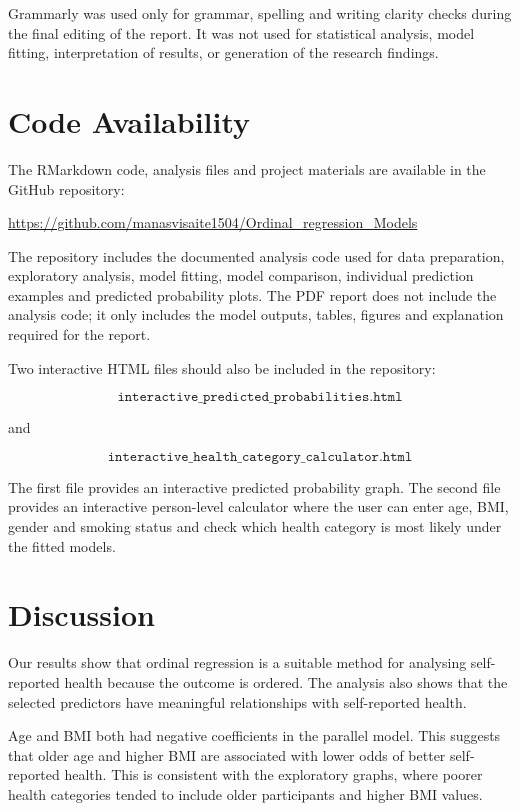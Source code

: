 \documentclass{article}
\begin{document}
Grammarly was used only for grammar, spelling and writing clarity checks
during the final editing of the report. It was not used for statistical
analysis, model fitting, interpretation of results, or generation of the
research findings.

\section{Code Availability}\label{code-availability}

The RMarkdown code, analysis files and project materials are available
in the GitHub repository:

\url{https://github.com/manasvisaite1504/Ordinal_regression_Models}

The repository includes the documented analysis code used for data
preparation, exploratory analysis, model fitting, model comparison,
individual prediction examples and predicted probability plots. The PDF
report does not include the analysis code; it only includes the model
outputs, tables, figures and explanation required for the report.

Two interactive HTML files should also be included in the repository:

\[
\texttt{interactive\_predicted\_probabilities.html}
\]

and

\[
\texttt{interactive\_health\_category\_calculator.html}
\]

The first file provides an interactive predicted probability graph. The
second file provides an interactive person-level calculator where the
user can enter age, BMI, gender and smoking status and check which
health category is most likely under the fitted models.

\section{Discussion}\label{discussion}

Our results show that ordinal regression is a suitable method for
analysing self-reported health because the outcome is ordered. The
analysis also shows that the selected predictors have meaningful
relationships with self-reported health.

Age and BMI both had negative coefficients in the parallel model. This
suggests that older age and higher BMI are associated with lower odds of
better self-reported health. This is consistent with the exploratory
graphs, where poorer health categories tended to include older
participants and higher BMI values.
\end{document}
